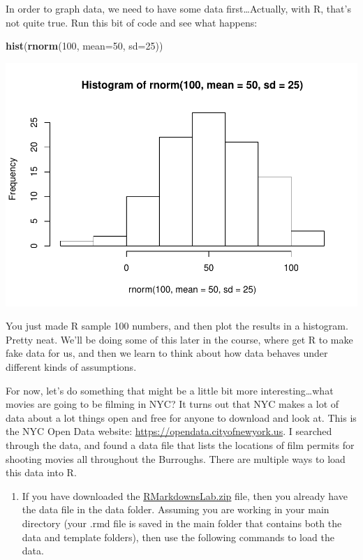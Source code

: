 \documentclass[]{book}
\newenvironment{Shaded}{\begin{snugshade}}{\end{snugshade}}
\newcommand{\KeywordTok}[1]{\textcolor[rgb]{0.13,0.29,0.53}{\textbf{#1}}}
\newcommand{\DataTypeTok}[1]{\textcolor[rgb]{0.13,0.29,0.53}{#1}}
\newcommand{\DecValTok}[1]{\textcolor[rgb]{0.00,0.00,0.81}{#1}}
\newcommand{\NormalTok}[1]{#1}
\providecommand{\tightlist}{%
  \setlength{\itemsep}{0pt}\setlength{\parskip}{0pt}}
\begin{document}
In order to graph data, we need to have some data first\ldots{}Actually,
with R, that's not quite true. Run this bit of code and see what
happens:

\begin{Shaded}
\begin{Highlighting}[]
\KeywordTok{hist}\NormalTok{(}\KeywordTok{rnorm}\NormalTok{(}\DecValTok{100}\NormalTok{, }\DataTypeTok{mean=}\DecValTok{50}\NormalTok{, }\DataTypeTok{sd=}\DecValTok{25}\NormalTok{))}
\end{Highlighting}
\end{Shaded}

\includegraphics{Statistics_Lab_files/figure-latex/unnamed-chunk-2-1.pdf}

You just made R sample 100 numbers, and then plot the results in a
histogram. Pretty neat. We'll be doing some of this later in the course,
where get R to make fake data for us, and then we learn to think about
how data behaves under different kinds of assumptions.

For now, let's do something that might be a little bit more
interesting\ldots{}what movies are going to be filming in NYC? It turns
out that NYC makes a lot of data about a lot things open and free for
anyone to download and look at. This is the NYC Open Data website:
\url{https://opendata.cityofnewyork.us}. I searched through the data,
and found a data file that lists the locations of film permits for
shooting movies all throughout the Burroughs. There are multiple ways to
load this data into R.

\begin{enumerate}
\def\labelenumi{\arabic{enumi}.}
\tightlist
\item
  If you have downloaded the
  \href{https://github.com/CrumpLab/statisticsLab/raw/master/RMarkdownsLab.zip}{RMarkdownsLab.zip}
  file, then you already have the data file in the data folder. Assuming
  you are working in your main directory (your .rmd file is saved in the
  main folder that contains both the data and template folders), then
  use the following commands to load the data.
\end{enumerate}
\end{document}
